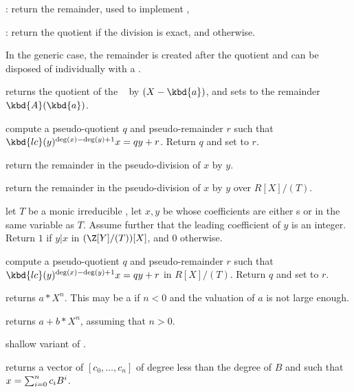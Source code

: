 \item {}: return the remainder, used to implement ,

\item {}: return the quotient if the division is exact, and
 otherwise.

In the generic case, the remainder is created after the quotient and can be
disposed of individually with a .


 returns the
quotient of the ~ by $(X - \kbd{a})$, and sets  to the
remainder $\kbd{A}(\kbd{a})$.


 compute a pseudo-quotient
$q$ and pseudo-remainder $r$ such that $\kbd{lc}(y)^{\deg(x) - \deg(y) + 1}x
= qy + r$. Return $q$ and set  to $r$.

 return the remainder
in the pseudo-division of $x$ by $y$.

 return the remainder
in the pseudo-division of $x$ by $y$ over $R[X]/(T)$.

 let $T$ be a monic irreducible
, let $x, y$ be  whose coefficients are either s or
 in the same variable as $T$. Assume further that the leading
coefficient of $y$ is an integer. Return $1$ if $y | x$ in $(\Z[Y]/(T))[X]$,
and $0$ otherwise.

 compute
a pseudo-quotient $q$ and pseudo-remainder $r$ such that
$\kbd{lc}(y)^{\deg(x) - \deg(y) + 1}x = qy + r$ in $R[X]/(T)$. Return $q$ and
set  to $r$.

 returns $a * X^n$. This may
be a  if $n < 0$ and the valuation of $a$ is not large
enough.

 returns $a + b * X^n$, assuming
that $n > 0$.

 shallow
variant of .

 returns a vector of 
$[c_0,\ldots,c_n]$ of degree less than the degree of $B$ and such that
$x=\sum_{i=0}^{n}{c_i\*B^i}$.

